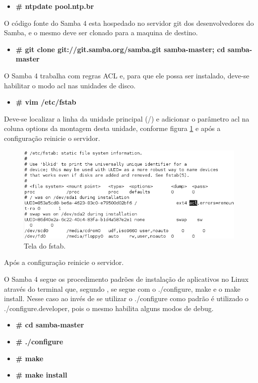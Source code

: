 \begin{itemize}
	\item \textbf{\# ntpdate pool.ntp.br}
\end{itemize}

O código fonte do Samba 4 esta hospedado no servidor git dos desenvolvedores do Samba, e o mesmo deve ser clonado para a maquina de destino.

\begin{itemize}
	\item \textbf{\# git clone git://git.samba.org/samba.git samba-master; cd samba-master}
\end{itemize}

O Samba 4 trabalha com regras ACL e, para que ele possa ser instalado, deve-se habilitar o modo acl nas unidades de disco.  

\begin{itemize}
	\item \textbf{\# vim /etc/fstab}
\end{itemize}

Deve-se localizar a linha da unidade principal (/) e adicionar o parâmetro acl na coluna options da montagem desta unidade, conforme figura \ref{fstab} e após a configuração reinicie o servidor.

\begin{figure}[ht]
   	\centering
    \includegraphics[width=0.8 \textwidth]{figuras/fstab}
   	\caption{Tela do fstab.}
    \label{fstab}
\end{figure}
 
Após a configuração reinicie o servidor.

O Samba 4 segue os procedimento padrões de instalação de aplicativos no Linux através do terminal que, segundo \cite{INSTALL}, se segue com o ./configure, make e o make install. Nesse caso ao invés de se utilizar o ./configure como padrão é utilizado o ./configure.developer, pois o mesmo habilita alguns modos de debug.

\begin{itemize}
		\item \textbf{\# cd samba-master}
		\item \textbf{\# ./configure}
		\item \textbf{\# make}
		\item \textbf{\# make install}
\end{itemize}

